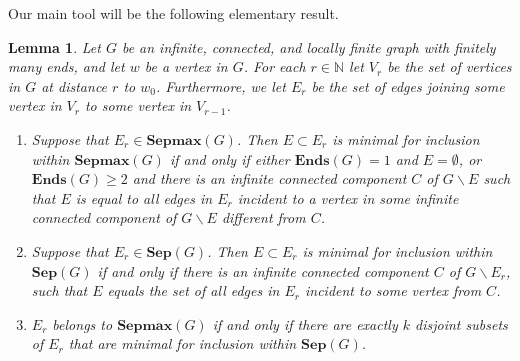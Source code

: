 \documentclass[10pt,A4]{amsart}
\newtheorem{lem}[thm]{Lemma}
\theoremstyle{definition}
\theoremstyle{definition}
\newcommand{\N}{\mathbb{N}}
\newcommand{\sep}[1]{\mathbf{Sep}({#1})}
\newcommand{\Ends}[1]{\mathbf{Ends}({#1})}
\newcommand{\sepmax}[1]{\mathbf{Sepmax}({#1})}
\begin{document}
Our main tool will be the following elementary result.
\begin{lem}\label{minimal-for-inclusion-sets}
    Let $G$ be an infinite, connected, and locally finite graph with finitely many ends, and let $w$ be a vertex in $G$. For each $r\in\N$ let $V_r$ be the set of vertices in $G$ at distance $r$ to $w_0$. Furthermore, we let $E_r$ be the set of edges joining some vertex in $V_r$ to some vertex in $V_{r-1}$.
    \begin{enumerate}
    \item Suppose that $E_r\in\sepmax{G}$. Then $E\subset E_r$ is minimal for inclusion within $\sepmax{G}$ if and only if either $\Ends{G}=1$ and $E=\emptyset$, or $\Ends{G}\geq2$ and there is an  infinite connected component $C$  of $G\smallsetminus E$ such that $E$ is equal to all edges in $E_r$ incident to a vertex in some infinite connected component of $G\smallsetminus E$ different from $C$.   
    
    \item Suppose that  $E_r\in\sep{G}$. Then $E\subset E_r$ is  minimal for inclusion within $\sep{G}$ if and only if there is an infinite connected component $C$ of $G\smallsetminus E_r$, such that $E$ equals the set of all edges in $E_r$ incident to some vertex from $C$. 
    \item $E_r$ belongs to $\sepmax{G}$ if and only if there are exactly $k$ disjoint subsets of $E_r$ that are minimal for inclusion within $\sep{G}$.
    \end{enumerate}
\end{lem}
\end{document}
